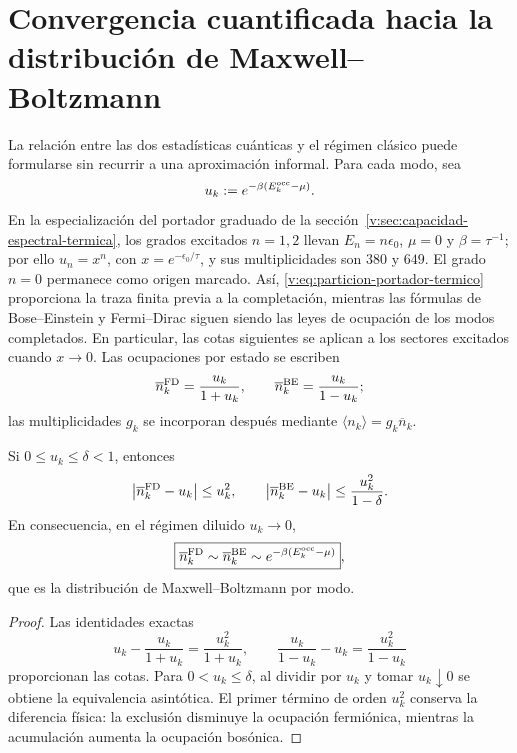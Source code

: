 \par\endgroup
\section[Convergencia cuantificada hacia la distribución de Maxwell--Boltzmann]{Convergencia cuantificada hacia la\\distribución de Maxwell--Boltzmann}
\label{v:rec:ocupacion:section:03}

La relación entre las dos estadísticas cuánticas y el régimen clásico puede
formularse sin recurrir a una aproximación informal. Para cada modo, sea
\[
 u_k:=e^{-\beta(E_k^{\rm occ}-\mu)}.
\]
En la especialización del portador graduado de la
sección~\ref{v:sec:capacidad-espectral-termica}, los grados excitados
$n=1,2$ llevan $E_n=n\epsilon_0$, $\mu=0$ y
$\beta=\tau^{-1}$; por ello $u_n=x^n$, con
$x=e^{-\epsilon_0/\tau}$, y sus multiplicidades son $380$ y $649$. El
grado $n=0$ permanece como origen marcado. Así,
\eqref{v:eq:particion-portador-termico} proporciona la traza finita
previa a la completación, mientras las fórmulas de Bose--Einstein y
Fermi--Dirac siguen siendo las leyes de ocupación de los modos
completados. En particular, las cotas siguientes se aplican a los
sectores excitados cuando $x\to0$.
Las ocupaciones por estado se escriben
\[
 \overline n_k^{\rm FD}=\frac{u_k}{1+u_k},
 \qquad
 \overline n_k^{\rm BE}=\frac{u_k}{1-u_k};
\]
las multiplicidades \(g_k\) se incorporan después mediante
\(\langle n_k\rangle=g_k\overline n_k\).

\begin{theorem}
\label{v:rec:thm:limite-clasico-fd-be-rev2}
Si \(0\leq u_k\leq\delta<1\), entonces
\[
 \left|\overline n_k^{\rm FD}-u_k\right|\leq u_k^2,
 \qquad
 \left|\overline n_k^{\rm BE}-u_k\right|
 \leq\frac{u_k^2}{1-\delta}.
\]
En consecuencia, en el régimen diluido \(u_k\to0\),
\[
 \boxed{
 \overline n_k^{\rm FD}\sim
 \overline n_k^{\rm BE}\sim
 e^{-\beta(E_k^{\rm occ}-\mu)}} ,
\]
que es la distribución de Maxwell--Boltzmann por modo.
\end{theorem}

\begin{proof}
Las identidades exactas
\[
 u_k-\frac{u_k}{1+u_k}=\frac{u_k^2}{1+u_k},
 \qquad
 \frac{u_k}{1-u_k}-u_k=\frac{u_k^2}{1-u_k}
\]
proporcionan las cotas. Para \(0<u_k\leq\delta\), al dividir por \(u_k\) y
tomar \(u_k\downarrow0\) se obtiene
la equivalencia asintótica. El primer término de orden \(u_k^2\) conserva la
diferencia física: la exclusión disminuye la ocupación fermiónica, mientras
la acumulación aumenta la ocupación bosónica.
\end{proof}
